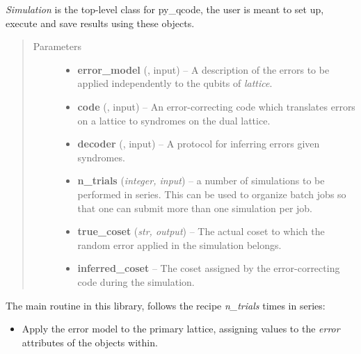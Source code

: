 \documentclass[letterpaper,10pt,english]{sphinxmanual}
\begin{document}
\begin{fulllineitems}
\label{simulation:py_qcode.Simulation}
\emph{Simulation} is the top-level class
for py\_qcode, the user is meant to set up, execute and save results
using these objects.
\begin{quote}\begin{description}
\item[{Parameters}] \leavevmode\begin{itemize}
\item {} 
\textbf{error\_model} (, input) -- A description of the errors to be applied independently to the qubits of \emph{lattice}.

\item {} 
\textbf{code} ({\hyperref[code:py_qcode.ErrorCorrectingCode]{}}, input) -- An error-correcting code which translates errors on a lattice to syndromes on the dual lattice.

\item {} 
\textbf{decoder} ({\hyperref[decoder:py_qcode.Decoder]{}}, input) -- A protocol for inferring errors given syndromes.

\item {} 
\textbf{n\_trials} (\emph{integer, input}) -- a number of simulations to be performed in series. This can be used to organize batch jobs so that one can submit more than one simulation per job.

\item {} 
\textbf{true\_coset} (\emph{str, output}) -- The actual coset to which the random error applied in the simulation belongs.

\item {} 
\textbf{inferred\_coset} -- The coset assigned by the error-correcting code during the simulation.

\end{itemize}

\end{description}\end{quote}

\begin{fulllineitems}
\label{simulation:py_qcode.Simulation.run}
The main routine in this library, follows the recipe \emph{n\_trials} times in series:
\begin{itemize}
\item {} 
Apply the error model to the primary lattice, assigning values to the \emph{error} attributes of the {\hyperref[lattice:py_qcode.Point]{}} objects within.


\end{itemize}
\end{fulllineitems}
\end{fulllineitems}
\end{document}
